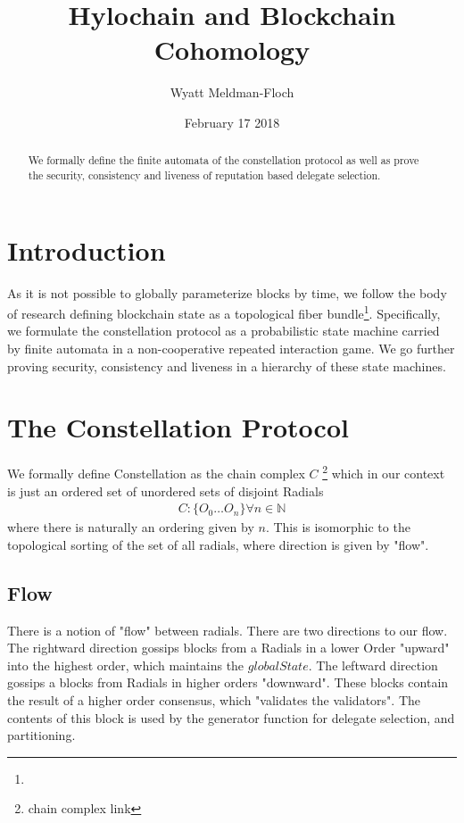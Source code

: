 \documentclass{article}
\title{Hylochain and Blockchain Cohomology}
\author{Wyatt Meldman-Floch}
\date{February 17 2018}
\begin{document}
\maketitle

\begin{abstract}
We formally define the finite automata of the constellation protocol as well as prove the security, consistency and liveness of  reputation based delegate selection.
\end{abstract}
\setcounter{secnumdepth}{0}
\section{Introduction}
As it is not possible to globally parameterize blocks by time, we follow the body of research defining blockchain state as a topological fiber bundle\footnote{}. Specifically, we formulate the constellation protocol as a probabilistic state machine carried by finite automata in a non-cooperative repeated interaction game. We go further proving security, consistency and liveness in a hierarchy of these state machines.

\section{The Constellation Protocol}
We formally define Constellation as the chain complex $C$ \footnote{chain complex link} which in our context is just an ordered set of unordered sets of disjoint Radials
\begin{align*}
C: \{O_0 \dots O_n \} \forall n \in \mathbb{N}
\end{align*}
where there is naturally an ordering given by $n$. This is isomorphic to the topological sorting of the set of all radials, where direction is given by "flow".

\subsection{Flow}
There is a notion of "flow" between radials. There are two directions to our flow. The rightward direction gossips blocks from a Radials in a lower Order "upward" into the highest order, which maintains the $globalState$. The leftward direction gossips a blocks from Radials in higher orders "downward". These blocks contain the result of a higher order consensus, which "validates the validators". The contents of this block is used by the generator function for delegate selection, and partitioning. 
\end{document}
